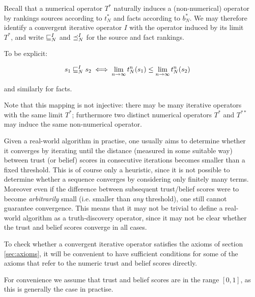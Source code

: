 \documentclass[../main.tex]{subfiles}
\begin{document}
\begin{remark}
Recall that a numerical operator $T^*$ naturally induces a (non-numerical)
operator by rankings sources according to $t_N^*$ and facts according to
$b_N^*$. We may therefore identify a convergent iterative operator $I$ with the
operator induced by its limit $T^*$, and write $\sqsubseteq_N^I$ and $\preceq_N^I$ for
the source and fact rankings.

To be explicit:

$$ s_1 \sqsubseteq_N^I s_2 \iff \lim_{n \rightarrow \infty}{t_N^n(s_1)} \le \lim_{n
\rightarrow \infty}{t_N^n(s_2)} $$

and similarly for facts.

Note that this mapping is not injective: there may be many iterative operators
with the same limit $T^*$; furthermore two distinct numerical operators $T^*$
and $T^{**}$ may induce the same non-numerical operator.
\end{remark}

Given a real-world algorithm in practise, one usually aims to determine whether
it converges by iterating until the distance (measured in some suitable way)
between trust (or belief) scores in consecutive iterations becomes smaller than
a fixed threshold. This is of course only a heuristic, since it is not possible
to determine whether a sequence converges by considering only finitely many
terms. Moreover even if the difference between subsequent trust/belief scores
were to become \emph{arbitrarily} small (i.e. smaller than \emph{any}
threshold), one still cannot guarantee convergence\footnotemark. This means
that it may not be trivial to define a real-world algorithm as a
truth-discovery operator, since it may not be clear whether the trust and
belief scores converge in all cases.


To check whether a convergent iterative operator satisfies the axioms of section
\ref{sec:axioms}, it will be convenient to have sufficient conditions for some
of the axioms that refer to the numeric trust and belief scores directly.

For convenience we assume that trust and belief scores are in the range $[0,
1]$, as this is generally the case in practise.
\end{document}
